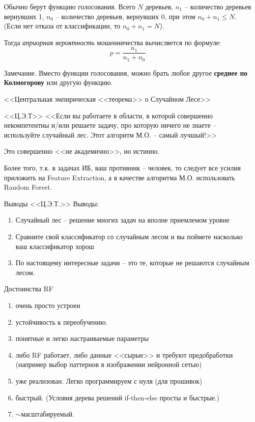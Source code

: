 \documentclass{beamer}
\newcommand{\term}{\textit}
\begin{document}
\begin{frame}
	Обычно берут функцию голосования. 
	Всего $N$ деревьев, 
	$n_1$ -- количество деревьев вернувших 1,
	$n_0$ -- количество деревьев, вернувших 0,
	при этом $n_0 + n_1 \leqslant N$. 
	(Если нет отказа от классификации, то $n_0 + n_1 = N$).
	
	Тогда \term{априорная вероятность} мошенничества
	вычисляется по формуле:
	\begin{equation}
	p = \frac{n_1}{n_1+n_0}
	\end{equation}
	
	\begin{block}{Замечание.}
		Вместо функции голосования, можно брать любое другое 
		\textbf{среднее по Колмогорову} или другую функцию.
	\end{block}
\end{frame}
  
\begin{frame}{<<Центральная эмпирическая <<теорема>> о Случайном Лесе>>}
	\begin{block}{<<Ц.Э.Т>>}
		<<Если вы работаете в области,
		в которой совершенно некомпетентны
		и/или решаете задачу, про которую ничего не знаете --
		используйте случайный лес.
		Этот алгоритм М.О. -- самый лучшый!>>
	\end{block}
	Это совершенно <<не академично>>, но истинно.
	
	Более того, т.к. в задачах ИБ, ваш противник --
	человек, то следует все усилия приложить на 
	Feature Extraction, а в качестве алгоритма М.О.
	использовать Random Forest. 
\end{frame}

\begin{frame}{Выводы <<Ц.Э.Т.>>}
	Выводы: 
	\begin{enumerate}
		\item Случайный лес -- решение многих 
	 	задач на вполне приемлемом уровне
	 	\item Сравните свой классификатор со случайным лесом 
	 	и вы поймете насколько ваш классификатор хорош
	 	\item По настоящему интересные задачи -- это те,
	 	которые не решаются случайным лесом.
	\end{enumerate}
\end{frame}

\begin{frame}{Достоинства RF}
	\begin{enumerate}
		\item очень просто устроен
		\item устойчивость к переобучению. 
		\item понятные и легко настраиваемые параметры
		\item либо RF работает, либо данные <<сырые>> и требуют предобработки (например выбор паттернов в изображении нейронной сетью)
		\item уже реализован. Легко программируем с нуля (для прошивок)
		\item быстрый. (Условия дерева решений if-then-else просты и быстрые.)
		\item $\sim$масштабируемый.
	\end{enumerate}
\end{frame}
\end{document}
